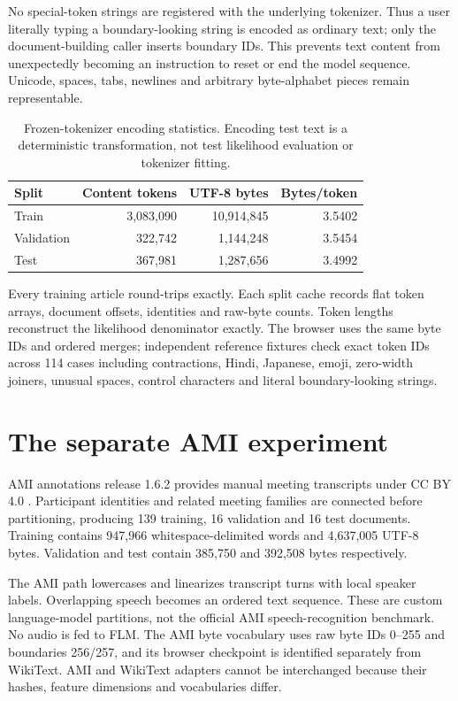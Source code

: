 \documentclass[10pt]{article}
\begin{document}
No special-token strings are registered with the underlying tokenizer. Thus a user literally typing a boundary-looking string is encoded as ordinary text; only the document-building caller inserts boundary IDs. This prevents text content from unexpectedly becoming an instruction to reset or end the model sequence. Unicode, spaces, tabs, newlines and arbitrary byte-alphabet pieces remain representable.

\begin{table}[ht]\centering
\begin{tabular}{lrrr}\toprule
Split & Content tokens & UTF-8 bytes & Bytes/token\\\midrule
Train & 3,083,090 & 10,914,845 & 3.5402\\
Validation & 322,742 & 1,144,248 & 3.5454\\
Test & 367,981 & 1,287,656 & 3.4992\\\bottomrule
\end{tabular}
\caption{Frozen-tokenizer encoding statistics. Encoding test text is a deterministic transformation, not test likelihood evaluation or tokenizer fitting.}
\end{table}

Every training article round-trips exactly. Each split cache records flat token arrays, document offsets, identities and raw-byte counts. Token lengths reconstruct the likelihood denominator exactly. The browser uses the same byte IDs and ordered merges; independent reference fixtures check exact token IDs across 114 cases including contractions, Hindi, Japanese, emoji, zero-width joiners, unusual spaces, control characters and literal boundary-looking strings.

\section{The separate AMI experiment}
AMI annotations release 1.6.2 provides manual meeting transcripts under CC BY 4.0 \cite{ami}. Participant identities and related meeting families are connected before partitioning, producing 139 training, 16 validation and 16 test documents. Training contains 947,966 whitespace-delimited words and 4,637,005 UTF-8 bytes. Validation and test contain 385,750 and 392,508 bytes respectively.

The AMI path lowercases and linearizes transcript turns with local speaker labels. Overlapping speech becomes an ordered text sequence. These are custom language-model partitions, not the official AMI speech-recognition benchmark. No audio is fed to FLM. The AMI byte vocabulary uses raw byte IDs 0--255 and boundaries 256/257, and its browser checkpoint is identified separately from WikiText. AMI and WikiText adapters cannot be interchanged because their hashes, feature dimensions and vocabularies differ.
\end{document}
